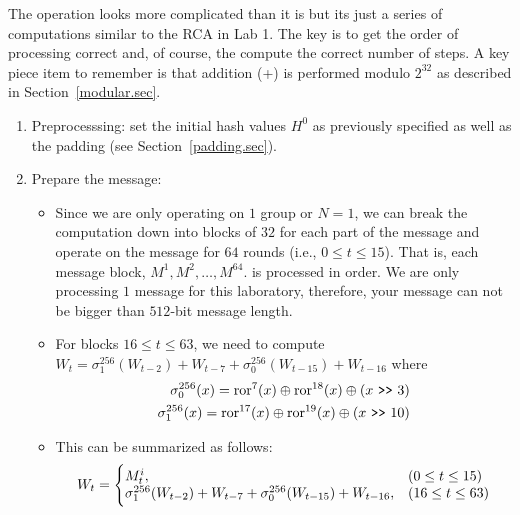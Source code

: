 \documentclass{article}
\begin{document}
The operation looks more complicated than it is but its just a series
of computations similar to the RCA in Lab 1.  The key is to get the order of
processing correct and, of course, the compute the correct number of steps.
A key piece item to remember is that
addition (+) is performed modulo $2^{32}$ as described in Section~\ref{modular.sec}.
\begin{enumerate}
  \item Preprocesssing: set the initial hash values $H^0$ as previously
    specified as well as the padding (see Section~\ref{padding.sec}).
  \item Prepare the message:
    \begin{itemize}
  \item Since we are only operating on $1$ group or $N=1$, we can
    break the computation down into blocks of $32$ for each part
    of the message and operate on the message for $64$ rounds (i.e.,
    $0 \leq t \leq 15$).
    That is, each message block, $M^1, M^2, \ldots, M^{64}$. 
    is processed in order.  We are only processing $1$ message for
    this laboratory, therefore, your message can not be bigger than
    $512$-bit message length.  
  \item For blocks $16 \leq t \leq 63$, we need to compute
    $W_t = \sigma_1^{256} (W_{t-2}) + W_{t-7} + \sigma_0^{256} (W_{t-15}) + W_{t-16}$
    where
    \begin{eqnarray*}
      \sigma_0^{256}(x) = \text{ror}^{7}(x) \oplus \text{ror}^{18}(x) \oplus (x~\verb!>>!~3)    \\
      \sigma_1^{256}(x) = \text{ror}^{17}(x) \oplus \text{ror}^{19}(x) \oplus (x~\verb!>>!~10)    
    \end{eqnarray*}
  \item This can be summarized as follows:
    \begin{eqnarray*}
      W_t = \Biggl\{
      \begin{array}{@{}ll@{}}
        M_t^i,      & (0 \leq t \leq 15)  \\
        \sigma_1^{256} (W_{t-2}) + W_{t-7} + \sigma_0^{256} (W_{t-15}) +  W_{t-16},  & (16 \leq t \leq 63) 
      \end{array}
    \end{eqnarray*}  
    
    \end{itemize}
    

\end{enumerate}
\end{document}
